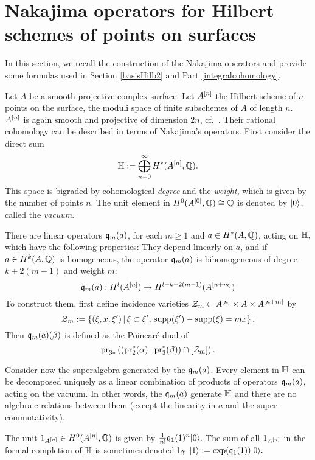 \section{Nakajima operators for Hilbert schemes of points on surfaces}
\label{Section_Hilbert}
In this section, we recall the construction of the Nakajima operators and provide some formulas used in Section \ref{basisHilb2} and Part \ref{integralcohomology}.

Let $A$ be a smooth projective complex surface. 
Let $A^{[n]}$ the Hilbert scheme of $n$ points on the surface, \ie the moduli space of finite subschemes of $A$ of length $n$.
$A^{[n]}$ is again smooth and projective of dimension $2n$, cf.~\cite{Fogarty}. 
Their rational cohomology can be described in terms of Nakajima's \cite{Nakajima} operators. First consider the direct sum
$$
\mathbb{H} := \bigoplus_{n=0}^{\infty} H^*(A^{[n]},\mathbb{Q}).
$$
This space is bigraded by cohomological \emph{degree} and the \emph{weight}, which is given by the number of points $n$. The unit element in $H^0(A^{[0]},\mathbb{Q}) \cong \mathbb{Q}$ is denoted by $|0\rangle$, called the \emph{vacuum}.
\begin{defipro}
There are linear operators $\mathfrak{q}_m(a)$, for each $m\geq 1$ and $a \in H^*(A,\mathbb{Q})$, acting on $\mathbb{H},$ which have the following properties: They depend linearly on $a$, and if $a\in H^k(A,\mathbb{Q})$ is homogeneous, the operator $\mathfrak{q}_{m}(a)$ is bihomogeneous of degree $k+2(m-1)$ and weight $m$:
$$
\mathfrak{q}_{m}(a) : H^l(A^{[n]}) \rightarrow H^{l+k+2(m-1)}(A^{[n+m]})
$$
To construct them, first define incidence varieties $\mathcal Z_m\subset A^{[n]}\times A\times A^{[n+m]}$ by
$$
\mathcal Z_m := \left\{(\xi,x,\xi')\, |\, \xi\subset\xi',\, \operatorname{supp}(\xi') -\operatorname{supp}(\xi) = mx \right\}.
$$
Then $\mathfrak{q}_m(a)(\beta) $ is defined as the Poincar\'e dual of 
$$
\operatorname{pr}_{3*}\left( \left(\operatorname{pr}_2^*(\alpha)\cdot \operatorname{pr}_3^*(\beta)\right) \cap [\mathcal Z_m] \right).
$$
\end{defipro}
Consider now the superalgebra generated by the $\mathfrak{q}_m(a)$. 
Every element in $\mathbb{H}$ can be decomposed uniquely as a linear combination of products of operators $\mathfrak{q}_{m}(a)$, acting on the vacuum. 
In other words, the $\mathfrak{q}_m(a)$ generate $\mathbb{H}$ and there are no algebraic relations between them (except the linearity in $a$ and the super-commutativity).
\begin{example}
The unit $1_{A^{[n]}} \in H^0({A^{[n]}},\mathbb{Q})$ is given by $\frac{1}{n!}\mathfrak{q}_1(1)^n|0\rangle$. The sum of all $1_{A^{[n]}}$ in the formal completion of $\mathbb{H}$ is sometimes denoted by
$
\left|1\right> := \exp(\mathfrak{q}_1(1))|0\rangle.
$
\end{example}

